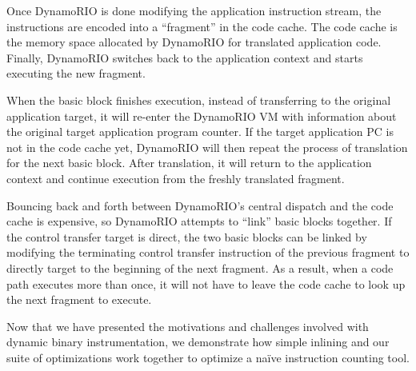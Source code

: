 Once DynamoRIO is done modifying the application instruction stream, the
instructions are encoded into a ``fragment'' in the code cache.  The code cache
is the memory space allocated by DynamoRIO for translated application code.
Finally, DynamoRIO switches back to the application context and starts executing
the new fragment.

When the basic block finishes execution, instead of transferring to the original
application target, it will re-enter the DynamoRIO VM with information about the
original target application program counter.  If the target application PC is
not in the code cache yet, DynamoRIO will then repeat the process of translation
for the next basic block.  After translation, it will return to the application
context and continue execution from the freshly translated fragment.

Bouncing back and forth between DynamoRIO's central dispatch and the code cache
is expensive, so DynamoRIO attempts to ``link'' basic blocks together.  If the
control transfer target is direct, the two basic blocks can be linked by
modifying the terminating control transfer instruction of the previous fragment
to directly target to the beginning of the next fragment.  As a result, when a
code path executes more than once, it will not have to leave the code cache to
look up the next fragment to execute.

Now that we have presented the motivations and challenges involved with dynamic
binary instrumentation, we demonstrate how simple inlining and our suite of
optimizations work together to optimize a na\"ive instruction counting tool.

